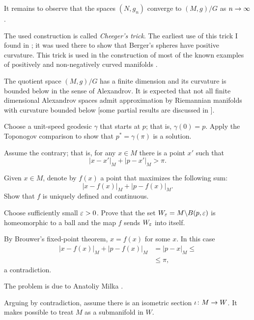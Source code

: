 It remains to observe that the spaces $(N,g_n)$ converge to $(M,g)/G$ as $n\z\to \infty$.\qeds

The used construction is called \emph{Cheeger's trick}.
The earliest use of this trick I found in \cite{GKM}; 
it was used there to show that Berger's spheres have positive curvature.
This trick is used in the construction of most of the known examples of positively and non-negatively curved manifolds
 \cite{cheeger,aloff-wallach,gromoll-meyer,eschenburg-spaces,bazajkin}.
 
The quotient space $(M,g)/G$ has a finite dimension and its curvature is bounded below in the sense of Alexandrov. 
It is expected that not all finite dimensional Alexandrov spaces admit approximation by Riemannian manifolds with curvature bounded below
[some partial results are discussed in ].








Choose a unit-speed geodesic $\gamma$ that starts at $p$;
that is, $\gamma(0)=p$.
Apply the Toponogov comparison to show that $p^*=\gamma(\pi)$ is a solution. 
\qeds

Assume the contrary;
that is, for any $x\in M$ there is a point $x'$ such that 
\[|x-x'|_M+|p-x'|_M>\pi.\]

Given $x\in M$, denote by $f(x)$ a point that maximizes the following sum:
\[|x-f(x)|_M+|p-f(x)|_M.\]
Show that $f$ is uniquely defined and continuous.

Choose sufficiently small $\varepsilon>0$.
Prove that the set $W_\varepsilon=M\backslash B(p,\varepsilon)$ 
is homeomorphic to a ball 
and the map $f$ sends $W_\varepsilon$ into itself.

By Brouwer's fixed-point theorem, $x=f(x)$ for some $x$.
In this case 
\begin{align*}
|x-f(x)|_M+|p-f(x)|_M&=|p-x|_M\le
\\
&\le\pi,
\end{align*}
a contradiction.\qeds
 
The problem is due to Anatoliy Milka \cite{milka-poly}.





Arguing by contradiction, 
assume there is an isometric section $\iota\: M\z\to W$.
It makes possible to treat $M$ as a submanifold in $W$.

